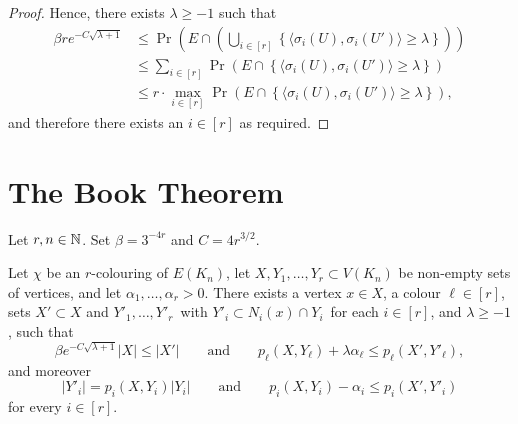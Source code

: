 \begin{proof}
  Hence, there exists $\lambda \ge -1$ such that
  \begin{align}\label{eq:max:big:and:E}
    \beta r e^{-C\sqrt{\lambda + 1}} &\le \Pr\left(E \cap \left( \bigcup_{i \in [r]} \left\{ \big\langle \sigma_i(U),\sigma_i(U') \big\rangle \ge \lambda \right\}\right)   \right) \\
    &\le \sum_{i \in [r]} \Pr\left(E \cap \left\{ \big\langle \sigma_i(U),\sigma_i(U') \big\rangle \ge \lambda \right\} \right)\\
    &\le r \cdot \max_{i \in [r]} \Pr\left(E \cap \left\{ \big\langle \sigma_i(U),\sigma_i(U') \big\rangle \ge \lambda \right\} \right) ,
  \end{align}
  and therefore there exists an $i \in [r]$ as required.

\end{proof}

\section{The Book Theorem}


\begin{lemma}
  \label{lem:key-lemma}

  Let $r, n\in\mathbb{N}$. Set $\beta = 3^{-4r}$ and $C = 4r^{3/2}$.

  Let\/ $\chi$ be an\/ $r$-colouring of\/ $E(K_n)$, let\/ $X,Y_1,\ldots,Y_r \subset V(K_n)$ be non-empty sets of vertices, and let $\alpha_1,\ldots,\alpha_r > 0$. There exists a vertex $x \in X$, a colour $\ell \in [r]$, sets $X' \subset X$ and\/ $Y'_1,\ldots,Y'_r\,$ with\/ $Y'_i \subset N_i(x) \cap Y_i\,$ for each $i \in [r]$, and\/ $\lambda \ge -1$, such that
  \begin{equation}\label{eq:key:ell}
    \beta e^{- C \sqrt{\lambda + 1}} |X| \le |X'| \qquad \text{and} \qquad p_\ell(X,Y_\ell) + \lambda \alpha_\ell \le p_\ell( X', Y'_\ell ) ,
  \end{equation}
  and moreover
  \begin{equation}\label{eq:key:alli}
    |Y'_i| = p_i(X,Y_i) |Y_i| \qquad \text{and} \qquad  p_i(X,Y_i) - \alpha_i \le p_i( X', Y'_i )
  \end{equation}
  for every $i \in [r]$.
\end{lemma}

